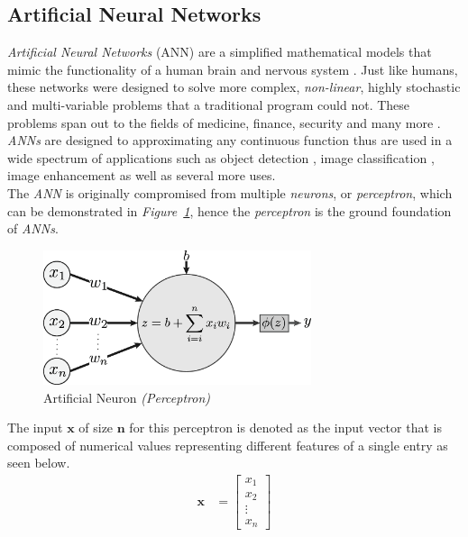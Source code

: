 \documentclass[12pt]{extarticle}
\begin{document}
	\subsection{Artificial Neural Networks}\label{ANN}
	\emph{Artificial Neural Networks} (ANN) are a simplified mathematical models that mimic the functionality of a human brain and nervous system \cite{ANN, ANN2}. Just like humans, these networks were designed to solve more complex, \emph{non-linear}, highly stochastic and multi-variable problems that a traditional program could not. These problems span out to the fields of medicine, finance, security and many more \cite{ANN_funct}. \emph{ANNs} are designed to approximating any continuous function thus are used in a wide spectrum of applications such as object detection \cite{Objdet, Objdet2}, image classification \cite{classification}, image enhancement \cite{enhancement} as well as several more uses.\\[5mm]
	The \emph{ANN} is originally compromised from multiple \emph{neurons}, or \emph{perceptron}, which can be demonstrated in \emph{Figure~\ref{fig:Perceptron}}, hence the \emph{perceptron} is the ground foundation of \emph{ANNs}.
	\begin{figure}[h]
		\centering
		\includegraphics[width=0.7\textwidth]{pics/Figures/Perceptron.eps}
		\caption{\small{Artificial Neuron \emph{(Perceptron)}}}
		\label{fig:Perceptron}
	\end{figure}
	
	The input $\bm{x}$ of size $\bm{n}$ for this perceptron is denoted as the input vector that is composed of numerical values representing different features of a single entry as seen below.
	\begin{align}
	\bm{x} &= \begin{bmatrix}\label{inputs}
		x_1 \\
		x_2 \\
		\vdots \\
		x_n
	\end{bmatrix}
	\end{align}
\end{document}
